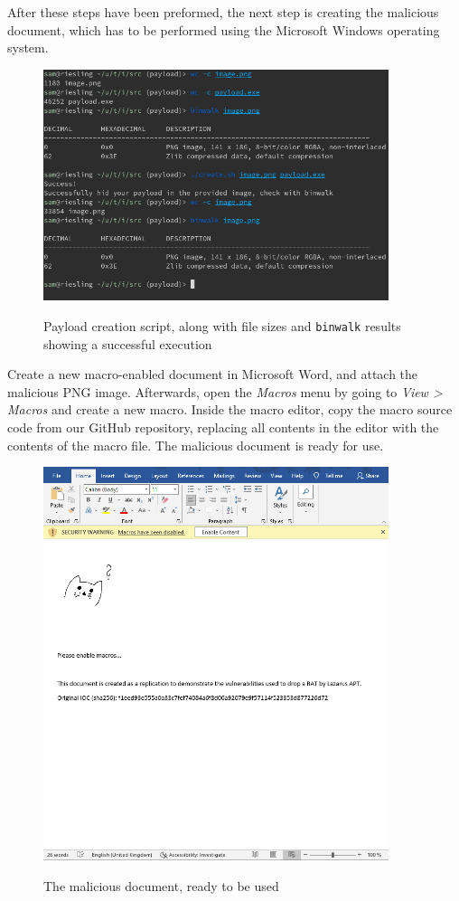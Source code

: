 After these steps have been preformed, the next step is creating the malicious document, which has to be performed using
the Microsoft Windows operating system. 
\begin{figure}[H]
  \centering
  \includegraphics[width=0.9\textwidth]{figures/payload_creation_script.png}
  \label{payload_creation_script}
  \caption{Payload creation script, along with file sizes and \texttt{binwalk} results showing a successful execution}
\end{figure}

Create a new macro-enabled document in Microsoft Word, and attach the malicious \acrshort{PNG} image.
Afterwards, open the \emph{Macros} menu by going to \emph{View > Macros} and create a new macro. Inside the macro
editor, copy the macro source code from our GitHub repository, replacing all contents in the editor with the contents of
the macro file. The malicious document is ready for use.

\begin{figure}[H]
  \centering
  \includegraphics[width=0.9\textwidth]{figures/malicious_document.png}
  \label{malicious_document}
  \caption{The malicious document, ready to be used}
\end{figure}

\clearpage


